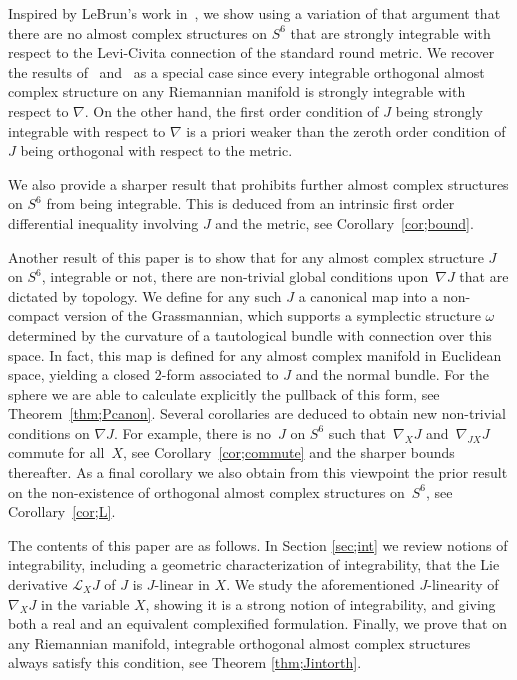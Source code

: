 \documentclass[10pt,a4paper]{amsart}
\numberwithin{equation}{section}
\begin{document}
Inspired by LeBrun's work in~\cite{L}, we show using a variation of that argument that there are no almost complex structures on $S^6$ that are strongly integrable with respect to the Levi-Civita connection of the standard round metric. We recover the results of~\cite{Bl} and~\cite{L} as a special case since every integrable orthogonal almost complex structure on any Riemannian manifold is strongly integrable with respect to $\nabla$. On the other hand, the first order condition of $J$ being strongly integrable with respect to $\nabla$ is a priori weaker than the zeroth order condition of $J$ being orthogonal with respect to the metric.

We also provide a sharper result that prohibits further almost complex structures on $S^6$ from being integrable. This is deduced from an intrinsic first order differential inequality involving $J$ and the metric, see Corollary~\ref{cor;bound}.

Another result of this paper is to show that for any almost complex structure $J$ on $S^6$, integrable or not, there are non-trivial global conditions upon~$\nabla J$ that are dictated by topology. We define for any such $J$ a canonical map into a non-compact version of the Grassmannian, which supports a symplectic structure $\omega$ determined by the curvature of a tautological bundle with connection over this space. In fact, this map is defined for any almost complex manifold in Euclidean space, yielding a closed $2$-form associated to $J$ and the normal bundle. For the sphere we are able to calculate explicitly the pullback of this form, see Theorem~\ref{thm;Pcanon}. Several corollaries are deduced to obtain new non-trivial conditions on $\nabla J$. For example, there is no~$J$ on $S^6$ such that~$\nabla_X J$ and~$\nabla_{JX} J$ commute for all~$X$, see Corollary~\ref{cor;commute} and the sharper bounds thereafter. As a final corollary we also obtain from this viewpoint the prior result on the non-existence of orthogonal almost complex structures on~$S^6$, see Corollary~\ref{cor;L}.

The contents of this paper are as follows. In Section \ref{sec;int} we review notions of integrability, including a geometric characterization of integrability, that the Lie derivative $\mathcal{L}_X J$ of $J$ is $J$-linear in $X$. We study the aforementioned $J$-linearity of $\nabla_X J$ in the variable $X$, showing it is a strong notion of integrability, and giving both a real and an equivalent complexified formulation. Finally, we prove that on any Riemannian manifold, integrable orthogonal almost complex structures always satisfy this condition,
see Theorem \ref{thm;Jintorth}.
\end{document}
